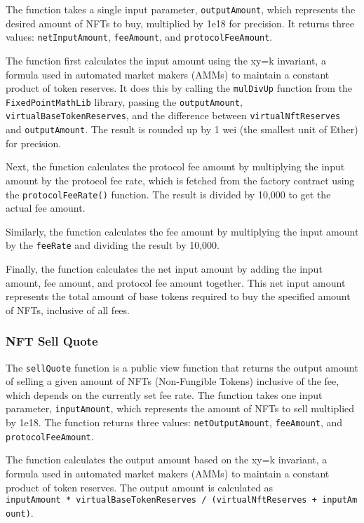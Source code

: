 The function takes a single input parameter, \texttt{outputAmount},
which represents the desired amount of NFTs to buy, multiplied by 1e18
for precision. It returns three values: \texttt{netInputAmount},
\texttt{feeAmount}, and \texttt{protocolFeeAmount}.

The function first calculates the input amount using the xy=k invariant,
a formula used in automated market makers (AMMs) to maintain a constant
product of token reserves. It does this by calling the \texttt{mulDivUp}
function from the \texttt{FixedPointMathLib} library, passing the
\texttt{outputAmount}, \texttt{virtualBaseTokenReserves}, and the
difference between \texttt{virtualNftReserves} and
\texttt{outputAmount}. The result is rounded up by 1 wei (the smallest
unit of Ether) for precision.

Next, the function calculates the protocol fee amount by multiplying the
input amount by the protocol fee rate, which is fetched from the factory
contract using the \texttt{protocolFeeRate()} function. The result is
divided by 10,000 to get the actual fee amount.

Similarly, the function calculates the fee amount by multiplying the
input amount by the \texttt{feeRate} and dividing the result by 10,000.

Finally, the function calculates the net input amount by adding the
input amount, fee amount, and protocol fee amount together. This net
input amount represents the total amount of base tokens required to buy
the specified amount of NFTs, inclusive of all fees.

\hypertarget{nft-sell-quote}{%
\subsubsection{NFT Sell Quote}\label{nft-sell-quote}}

The \texttt{sellQuote} function is a public view function that returns
the output amount of selling a given amount of NFTs (Non-Fungible
Tokens) inclusive of the fee, which depends on the currently set fee
rate. The function takes one input parameter, \texttt{inputAmount},
which represents the amount of NFTs to sell multiplied by 1e18. The
function returns three values: \texttt{netOutputAmount},
\texttt{feeAmount}, and \texttt{protocolFeeAmount}.

The function calculates the output amount based on the xy=k invariant, a
formula used in automated market makers (AMMs) to maintain a constant
product of token reserves. The output amount is calculated as
\texttt{inputAmount\ *\ virtualBaseTokenReserves\ /\ (virtualNftReserves\ +\ inputAmount)}.

